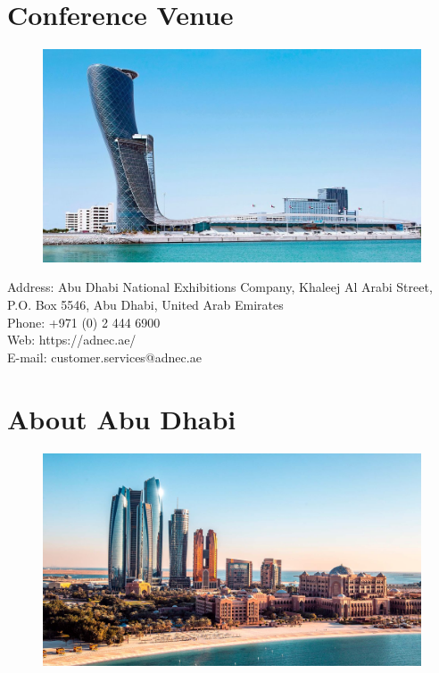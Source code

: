 \section{Conference Venue}

 \begin{figure}[h!]
  \centering
      \includegraphics[width=0.9\linewidth]{examples/handbook_coling25/local_guide/images/location.png}
 \end{figure}

 Address: Abu Dhabi National Exhibitions Company, Khaleej Al Arabi Street, P.O. Box 5546, Abu Dhabi, United Arab Emirates\\
 Phone: +971 (0) 2 444 6900\\
 Web: https://adnec.ae/\\
 E-mail: customer.services@adnec.ae\\

\section{About Abu Dhabi}

 \begin{figure}[h!]
  \centering
      \includegraphics[width=0.9\linewidth]{examples/handbook_coling25/local_guide/images/abu-dhabi.png}
 \end{figure}
 \leavevmode\newline

